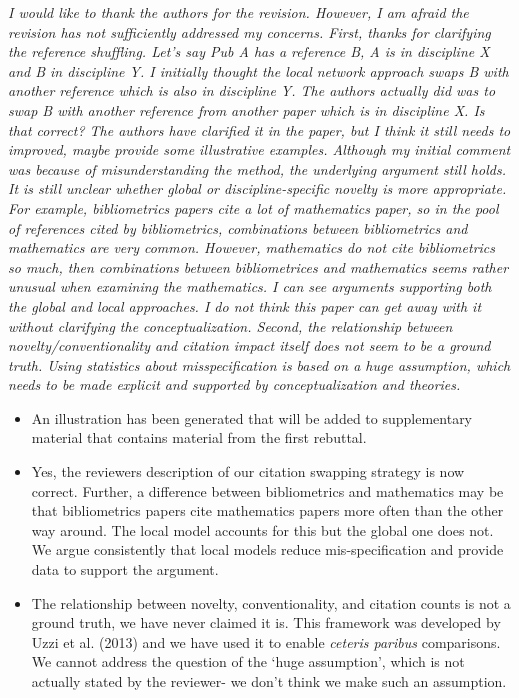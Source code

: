 \documentclass[11pt, oneside]{article}   	%
\begin{document}
\emph{I would like to thank the authors for the revision.  However, I am afraid the revision has not sufficiently addressed my concerns. First, thanks for clarifying the reference shuffling.  Let’s say Pub A has a reference B, A is in discipline X and B in discipline Y.  I initially thought the local network approach swaps B with another reference which is also in discipline Y.  The authors actually did was to swap B with another reference from another paper which is in discipline X.  Is that correct?  The authors have clarified it in the paper, but I think it still needs to improved, maybe provide some illustrative examples.  Although my initial comment was because of misunderstanding the method, the underlying argument still holds.  It is still unclear whether global or discipline-specific novelty is more appropriate.  For example, bibliometrics papers cite a lot of mathematics paper, so in the pool of references cited by bibliometrics, combinations between bibliometrics and mathematics are very common.  However, mathematics do not cite bibliometrics so much, then combinations between bibliometrices and mathematics seems rather unusual when examining the mathematics.  I can see arguments supporting both the global and local approaches.  I do not think this paper can get away with it without clarifying the conceptualization. Second, the relationship between novelty/conventionality and citation impact itself does not seem to be a ground truth. Using statistics about misspecification is based on a huge assumption, which needs to be made explicit and supported by conceptualization and theories.}

\begin{itemize}
\item An illustration has been generated that will be added to supplementary material that contains material from the first rebuttal.
\item Yes, the reviewers description of our citation swapping strategy is now correct. Further, a difference between bibliometrics and mathematics may be that bibliometrics papers cite mathematics papers more often than the other way around. The local model accounts for this but the global one does not. We argue consistently that local models reduce mis-specification and provide data to support the argument.
\item The relationship between novelty, conventionality, and citation counts is not a ground truth, we have never claimed it is. This framework was developed by Uzzi et al. (2013) and we have used it to enable \emph{ceteris paribus} comparisons. We cannot address the question of the `huge assumption', which is not actually stated by the reviewer- we don't think we make such an assumption.
\end{itemize}
\end{document}

